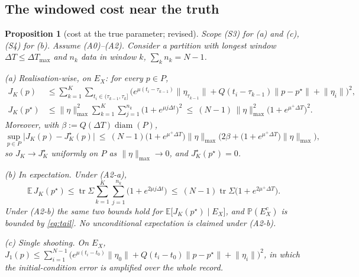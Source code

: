 \documentclass[11pt]{article}
\newtheorem{proposition}{Proposition}
\theoremstyle{remark}\newtheorem{remark}{Remark}
\newcommand{\pstar}{p^\star}
\newcommand{\norm}[1]{\lVert #1\rVert}
\newcommand{\rev}[1]{\textcolor{blue!55!black}{#1}}
\begin{document}
\subsection{The windowed cost near the truth}\label{sec:cost}
\begin{proposition}[cost at the true parameter; \rev{revised}]\label{prop:cost}
\emph{Scope (S3) for (a) and (c), (S4) for (b).} Assume (A0)--(A2). Consider a partition with longest window $\Delta T\le\Delta T_{\max}$ and $n_k$ data in window $k$, $\sum_k n_k=N-1$.

\emph{(a) Realisation-wise, on $E_X$:} for every $p\in P$,
\begin{align}
J_K(p)&\le\sum_{k=1}^{K}\sum_{t_i\in(\tau_{k-1},\tau_k]}
 \Big(e^{\mu(t_i-\tau_{k-1})}\norm{\eta_{\tau_{k-1}}}
 +Q(t_i-\tau_{k-1})\norm{p-\pstar}+\norm{\eta_i}\Big)^2,\label{eq:JK_bound}\\
J_K(\pstar)&\le\norm{\eta}_{\max}^2\sum_{k=1}^{K}\sum_{j=1}^{n_k}\big(1+e^{\mu j\Delta t}\big)^2
 \ \le\ (N-1)\,\norm{\eta}_{\max}^2\big(1+e^{\mu^{+}\Delta T}\big)^2 .\label{eq:JK_true}
\end{align}
Moreover, with $\beta:=Q(\Delta T)\operatorname{diam}(P)$,
\begin{equation}
\sup_{p\in P}\big|J_K(p)-J_K^\star(p)\big|\ \le\
(N-1)\big(1+e^{\mu^{+}\Delta T}\big)\norm\eta_{\max}
\Big(2\beta+\big(1+e^{\mu^{+}\Delta T}\big)\norm\eta_{\max}\Big),
\label{eq:JK_unif}
\end{equation}
so $J_K\to J_K^\star$ uniformly on $P$ as $\norm\eta_{\max}\to0$, and $J_K^\star(\pstar)=0$.

\emph{(b) In expectation.} Under (A2-a),
\begin{equation}
\mathbb E\,J_K(\pstar)\le\operatorname{tr}\Sigma\sum_{k=1}^{K}\sum_{j=1}^{n_k}\big(1+e^{2\mu j\Delta t}\big)
 \ \le\ (N-1)\operatorname{tr}\Sigma\big(1+e^{2\mu^{+}\Delta T}\big).
\label{eq:JK_expect}
\end{equation}
Under (A2-b) the same two bounds hold for $\mathbb E\big[J_K(\pstar)\mid E_X\big]$, and $\mathbb P(E_X^{c})$ is bounded by \eqref{eq:tail}. No unconditional expectation is claimed under (A2-b).

\emph{(c) Single shooting.} On $E_X$, $J_1(p)\le\sum_{i=1}^{N-1}\big(e^{\mu(t_i-t_0)}\norm{\eta_0}+Q(t_i-t_0)\norm{p-\pstar}+\norm{\eta_i}\big)^2$, in which the initial-condition error is amplified over the whole record.
\end{proposition}
\end{document}
